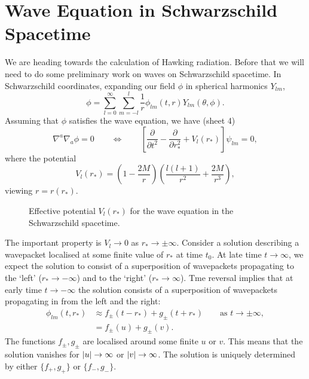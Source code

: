 
\section{Wave Equation in Schwarzschild Spacetime}%
\label{sec:wave_equation_in_schwarzschild_spacetime}

We are heading towards the calculation of Hawking radiation. Before that we will need to do some preliminary work on waves on Schwarzschild spacetime.
In Schwarzschild coordinates, expanding our field $\phi$ in spherical harmonics $Y_{lm}$,
\begin{equation}
  \phi = \sum_{l=0}^{\infty} \sum_{m = -l}^{l} \frac{1}{r} \phi_{lm}(t, r) Y_{lm}(\theta, \phi).
\end{equation}
Assuming that $\phi$ satisfies the wave equation, we have (sheet 4)
\begin{equation}
  \nabla^{a} \nabla_{a} \phi = 0 \qquad \iff \qquad \left[ \frac{\partial }{\partial t^2} - \frac{\partial }{\partial r^2_*} + V_l(r_*) \right] \psi_{lm} = 0,
\end{equation}
where the potential
\begin{equation}
  V_l(r_*) = \left( 1 - \frac{2M}{r} \right) \left( \frac{l (l +1)}{r^2} + \frac{2M}{r^3} \right),
\end{equation}
viewing $r = r(r_*)$.
\begin{figure}[ht]
  \centering
  \caption{Effective potential $V_l(r_*)$ for the wave equation in the Schwarzschild spacetime.}
  \label{fig:l22f1}
\end{figure}
The important property is $V_l \to 0$ as $r_* \to \pm \infty$.
Consider a solution describing a wavepacket localised at some finite value of $r_*$ at time $t_0$.
At late time $t \to \infty$, we expect the solution to consist of a superposition of wavepackets propagating to the `left' ($r_* \to -\infty$) and to the `right' ($r_* \to \infty$).
Tme reversal implies that at early time $t \to -\infty$ the solution consists of a superposition of wavepackets propagating in from the left and the right:
\begin{align}
  \phi_{lm}(t, r_*) &\approx f_{\pm}(t - r_*) + g_{\pm}(t+ r_*) \qquad \text{as } t \to \pm \infty, \\
		    &= f_{\pm}(u) + g_{\pm} (v).
\end{align}
The functions $f_{\pm}, g_{\pm}$ are localised around some finite $u$ or $v$. This means that the solution vanishes for $\abs{u} \to \infty$ or $\abs{v} \to \infty$.
The solution is uniquely determined by either $\{f_+, g_+\}$ or $\{f_-, g_-\}$.

